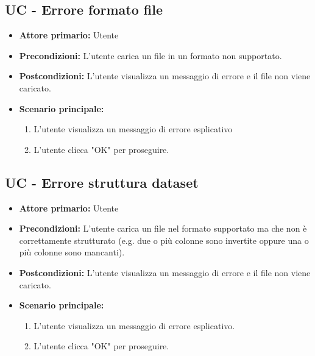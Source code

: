\subsection{UC - Errore formato file}
\label{sec:UC - Errore formato file}
\begin{itemize}
    \item \textbf{Attore primario:} Utente
    \item \textbf{Precondizioni:} L'utente carica un file in un formato non supportato.
    \item \textbf{Postcondizioni:} L'utente visualizza un messaggio di errore e il file non viene caricato.
    \item \textbf{Scenario principale:}
          \begin{enumerate}
              \item L'utente visualizza un messaggio di errore esplicativo
              \item L'utente clicca "OK" per proseguire.
          \end{enumerate}
\end{itemize}

\subsection{UC - Errore struttura dataset}
\label{sec:UC - Errore struttura dataset}
\begin{itemize}
    \item \textbf{Attore primario:} Utente
    \item \textbf{Precondizioni:} L'utente carica un file nel formato supportato ma che non è correttamente strutturato  
                                  (e.g. due o più colonne sono invertite oppure una o più colonne sono mancanti). 
    \item \textbf{Postcondizioni:} L'utente visualizza un messaggio di errore e il file non viene caricato.
    \item \textbf{Scenario principale:}
          \begin{enumerate}
              \item L'utente visualizza un messaggio di errore esplicativo.
              \item L'utente clicca "OK" per proseguire.
          \end{enumerate} 
\end{itemize}

